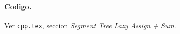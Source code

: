 \paragraph{Codigo.}
Ver \texttt{cpp.tex}, seccion \textit{Segment Tree Lazy Assign + Sum}.

\vspace{0.5em}

